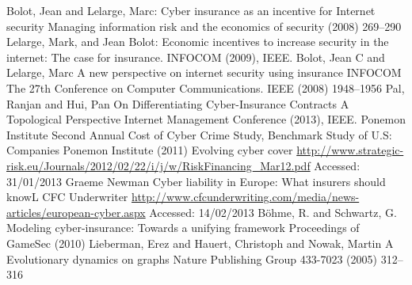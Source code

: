 \documentclass{llncs}
\begin{document}

%
\begin{thebibliography}{[MT1]}
%
  Bolot, Jean and Lelarge, Marc:
  Cyber insurance as an incentive for Internet security
  Managing information risk and the economics of security
  (2008) 269--290
%
	Lelarge, Mark, and Jean Bolot:
	Economic incentives to increase security in the internet: The case for insurance.
	INFOCOM (2009), IEEE.
%
	Bolot, Jean C and Lelarge, Marc
 	A new perspective on internet security using insurance
 	INFOCOM The 27th Conference on Computer Communications. IEEE
 	(2008) 1948--1956
	Pal, Ranjan and Hui, Pan	
	On Differentiating Cyber-Insurance Contracts A Topological Perspective
  	Internet Management Conference (2013), IEEE.
%
Ponemon Institute
Second Annual Cost of Cyber Crime Study, Benchmark Study of U.S: Companies
Ponemon Institute (2011)
%
  Evolving cyber cover
  \url{http://www.strategic-risk.eu/Journals/2012/02/22/i/j/w/RiskFinancing_Mar12.pdf}
  Accessed: 31/01/2013
	Graeme Newman
	Cyber liability in Europe: What insurers should knowL
	CFC Underwriter \url{http://www.cfcunderwriting.com/media/news-articles/european-cyber.aspx}
 	Accessed: 14/02/2013
  B{\"o}hme, R. and Schwartz, G.
  Modeling cyber-insurance: Towards a unifying framework
  Proceedings of GameSec (2010)
%
Lieberman, Erez and Hauert, Christoph and Nowak, Martin A
 Evolutionary dynamics on graphs
Nature Publishing Group 433-7023 (2005) 312--316

  
%
%
%
%
\end{thebibliography}
%
\end{document}
